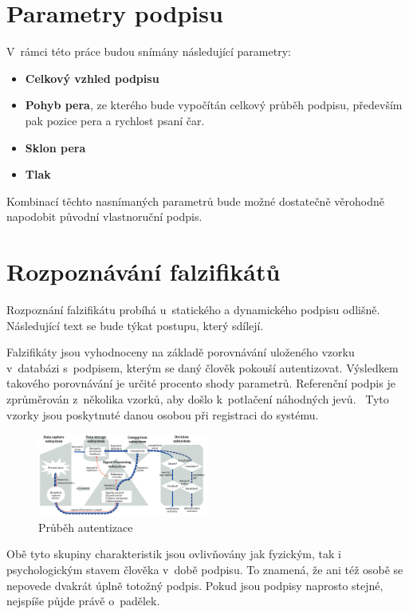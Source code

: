 \newpage

\section{Parametry podpisu}
V~rámci této práce budou snímány následující parametry:
\begin{itemize}
  \item \textbf{Celkový vzhled podpisu}
  \item \textbf{Pohyb pera}, ze kterého bude vypočítán celkový průběh podpisu, především pak pozice pera a rychlost psaní čar. 
  \item \textbf{Sklon pera} 
  \item \textbf{Tlak}
\end{itemize}
Kombinací těchto nasnímaných parametrů bude možné dostatečně věrohodně napodobit původní vlastnoruční podpis. 

\section{Rozpoznávání falzifikátů}
Rozpoznání falzifikátu probíhá u~statického a dynamického podpisu odlišně. 
Následující text se bude týkat postupu, který sdílejí.

Falzifikáty jsou vyhodnoceny na základě porovnávání uloženého vzorku v~databázi s~podpisem, kterým se daný člověk pokouší autentizovat.
Výsledkem takového porovnávání je určité procento shody parametrů.
Referenční podpis je zprůměrován z~několika vzorků, aby došlo k~potlačení náhodných jevů.~\cite{VUT2009} %
Tyto vzorky jsou poskytnuté danou osobou při registraci do systému.

\begin{figure}[h]
  \centering
  \includegraphics[width=0.5\textwidth]{obrazky-figures/proces_autentizace.png}
  \caption{Průběh autentizace~\cite{ISOIEC19795-1_2021}}
  \label{fig:proces_autentizace} %
\end{figure}

Obě tyto skupiny charakteristik jsou ovlivňovány jak fyzickým, tak i psychologickým stavem člověka v~době podpisu.
To znamená, že ani též osobě se nepovede dvakrát úplně totožný podpis.
Pokud jsou podpisy naprosto stejné, nejspíše půjde právě o~padělek.

